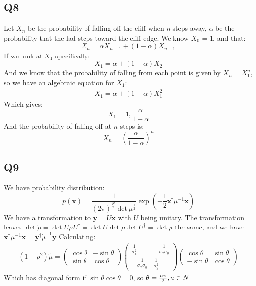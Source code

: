 \documentclass[../main.tex]{subfiles}
\begin{document}
\subsection{Q8}
Let $X_n$ be the probability of falling off the cliff when $n$ steps away, $\alpha$ be the probability that the lad steps toward the cliff-edge. We know $X_0$ = 1, and that:
\begin{equation}
	X_n=\alpha X_{n-1} + (1-\alpha) X_{n+1}
\end{equation}
If we look at $X_1$ specifically:
\begin{equation}
		X_1=\alpha+(1-\alpha)X_2
\end{equation}
And we know that the probability of falling from each point is given by $X_n=X_1^{n}$, so we have an algebraic equation for $X_1$:
\begin{align}
	X_1=\alpha+(1-\alpha)X_1^2
\end{align}
Which gives:
\begin{equation}
	X_1=1,\frac{\alpha}{1-\alpha}
\end{equation}
And the probability of falling off at $n$ steps is:
\begin{equation}
	X_n = \left(\frac{\alpha}{1-\alpha}\right)^n
\end{equation}
\subsection{Q9}
We have probability distribution:
\begin{equation}
	p(\mathbf{x}) = \frac{1}{(2\pi)^{\frac{N}{2}}\det{\mu}^{\frac{1}{2}}}\exp{\left(-\frac{1}{2}\mathbf{x}^\dag\mu^{-1}\mathbf{x}\right)}
\end{equation}
We have a transformation to $\mathbf{y}=U\mathbf{x}$ with $U$ being unitary. The transformation leaves $\det{\tilde\mu}=\det{U\mu U^\dag}=\det{U}\det{\mu}\det{U^\dag}=\det{\mu}$ the same, and we have $\mathbf{x^\dag}\mu^{-1}\mathbf{x}=\mathbf{y^\dag}\tilde\mu^{-1}\mathbf{y}$
Calculating:
\begin{align}
(1-\rho^2)\tilde\mu = \left(\begin{matrix}\cos\theta & -\sin\theta \\ \sin\theta & \cos\theta\end{matrix}\right) 
\left(\begin{matrix}\frac{1}{\sigma_x^2} & -\frac{1}{\sigma_x\sigma_y} \\ - \frac{1}{\sigma_x\sigma_y} & \frac{1}{\sigma_y^2}\end{matrix} \right)
\left( \begin{matrix}\cos\theta & \sin\theta \\ -\sin\theta & \cos\theta\end{matrix}\right)
\end{align}
Which has diagonal form if $\sin\theta\cos\theta=0$, so $\theta=\frac{n\pi}{2}, n\in\mathcal \mathbb{N}$
\end{document}
